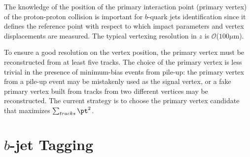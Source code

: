 The knowledge of the position of the primary interaction point (primary vertex) of the proton-proton collision is important for $b$-quark jets identification since it defines the reference point with respect to which impact parameters and vertex displacements are measured.  The typical vertexing resolution in $z$ is $\mathcal{O}$($100 \mu$m).


To ensure a good resolution on the vertex position, the primary vertex
must be reconstructed from at least five tracks. The choice of the primary vertex is less trivial in the presence of minimum-bias events from pile-up:
the primary vertex from a pile-up event may be mistakenly used as the signal vertex, or a fake primary vertex built from tracks from two different vertices may be reconstructed. The current strategy is to choose the primary vertex candidate that maximizes $\sum_{tracks} \pt^2$.

\section{ $b$-jet Tagging}\label{sec:btagging}



